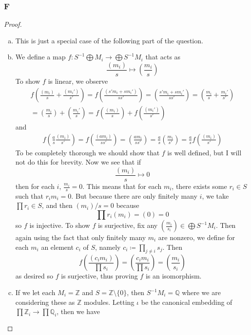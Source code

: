 \documentclass{article}
\newcommand{\Z}{\mathbb{Z}}
\newcommand{\Q}{\mathbb{Q}}
\begin{document}
\subsubsection{F}\label{1.3.F}
\begin{proof}

\begin{enumerate}[(a)]
    \item This is just a special case of the following part of the question.
    \item We define a map $f:S^{-1}\bigoplus M_i\to \bigoplus S^{-1}M_i$ that acts as
    \[
    \frac{(m_i)}{s}\mapsto (\frac{m_i}{s})
    \]
    To show $f$ is linear, we observe
    \begin{align*}
        f(\frac{(m_i)}{s}+\frac{(m_i')}{s'})=f(\frac{(s'm_i+sm_i')}{ss'})=(\frac{s'm_i+sm_i'}{ss'})=(\frac{m_i}{s}+\frac{m_i'}{s'})\\
        =(\frac{m_i}{s})+(\frac{m_i'}{s})=f(\frac{(m_i)}{s})+f(\frac{(m_i')}{s'})
    \end{align*}
    and
    \begin{align*}
        f(\frac{a}{s}\frac{(m_i)}{s'})=f(\frac{(am_i)}{ss'})=(\frac{am_i}{ss'})=\frac{a}{s}(\frac{m_i}{s'})=\frac{a}{s}f(\frac{(m_i)}{s'})
    \end{align*}
    To be completely thorough we should show that $f$ is well defined, but I will not do this for brevity. Now we see that if
    \[
    \frac{(m_i)}{s}\mapsto 0
    \]
    then for each $i$, $\frac{m_i}{s}=0$. This means that for each $m_i$, there exists some $r_i\in S$ such that $r_im_i=0$. But because there are only finitely many $i$, we take $\prod r_i\in S$, and then $(m_i)/s=0$ because
    \[
    \prod r_i(m_i)=(0)=0
    \]
    so $f$ is injective. To show $f$ is surjective, fix any $(\frac{m_i}{s_i})\in \bigoplus S^{-1}M_i$. Then again using the fact that only finitely many $m_i$ are nonzero, we define for each $m_i$ an element $c_i$ of $S$, namely $c_i\coloneqq\prod_{j\ne i} s_j$. Then 
    \[
    f(\frac{(c_i m_i)}{\prod s_i})=(\frac{c_im_i}{\prod s_i})=(\frac{m_i}{s_i})
    \]
    as desired so $f$ is surjective, thus proving $f$ is an isomorphism.
    \item 
    If we let each $M_i=\Z$ and $S=\Z\setminus\{0\}$, then $S^{-1}M_i= \Q$ where we are considering these as $\Z$ modules. Letting $\iota$ be the canonical embedding of $\prod \Z_i \to \prod \Q_i$, then we have
    \begin{center}
\end{center}
\end{enumerate}
\end{proof}
\end{document}
